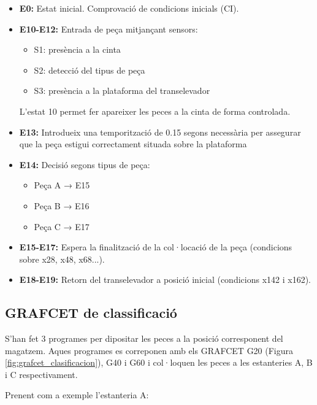 \documentclass[12pt,a4paper]{report}
\begin{document}
\begin{itemize}
\item \textbf{E0:} Estat inicial. Comprovació de condicions inicials (CI).
\item \textbf{E10-E12:} Entrada de peça mitjançant sensors:
  \begin{itemize}
  \item S1: presència a la cinta
  \item S2: detecció del tipus de peça
  \item S3: presència a la plataforma del transelevador
  \end{itemize}
    L'estat 10 permet fer apareixer les peces a la cinta de forma controlada.
\item \textbf{E13:} Introdueix una temporització de 0.15 segons necessària per assegurar que la peça estigui correctament situada sobre la plataforma

\item \textbf{E14:} Decisió segons tipus de peça:
  \begin{itemize}
  \item Peça A → E15
  \item Peça B → E16
  \item Peça C → E17
  \end{itemize}

\item \textbf{E15-E17:} Espera la finalització de la col·locació de la peça (condicions sobre x28, x48, x68...).

\item \textbf{E18-E19:} Retorn del transelevador a posició inicial (condicions x142 i x162).

\end{itemize}



\subsection{GRAFCET de classificació}

S'han fet 3 programes per dipositar les peces a la posició corresponent del magatzem. Aques programes es correponen amb els GRAFCET G20 (Figura \ref{fig:grafcet_clasificacion}), G40 i G60 i col·loquen les peces a les estanteries A, B i C respectivament.


Prenent com a exemple l'estanteria A:
\end{document}
